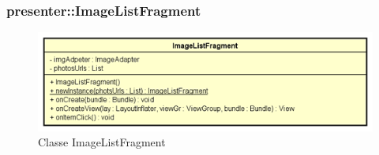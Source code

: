 \documentclass[../DefinizioneDiProdotto.tex]{subfiles}
\begin{document}
\subsubsection{presenter::ImageListFragment}

    \begin{figure}[H]
        \centering
        \includegraphics{img/ImageListFragment.png}
        \caption{Classe ImageListFragment}\label{fig:presenter::ImageListFragment} 
    \end{figure}
\end{document}
